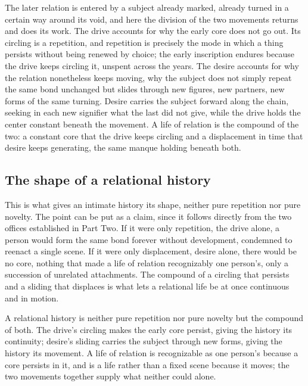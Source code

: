 The later relation is entered by a subject already marked, already turned in a certain way around its void, and here the division of the two movements returns and does its work. The drive accounts for why the early core does not go out. Its circling is a repetition, and repetition is precisely the mode in which a thing persists without being renewed by choice; the early inscription endures because the drive keeps circling it, unspent across the years. The desire accounts for why the relation nonetheless keeps moving, why the subject does not simply repeat the same bond unchanged but slides through new figures, new partners, new forms of the same turning. Desire carries the subject forward along the chain, seeking in each new signifier what the last did not give, while the drive holds the center constant beneath the movement. A life of relation is the compound of the two: a constant core that the drive keeps circling and a displacement in time that desire keeps generating, the same manque holding beneath both.

\subsection*{The shape of a relational history}

This is what gives an intimate history its shape, neither pure repetition nor pure novelty. The point can be put as a claim, since it follows directly from the two offices established in Part Two. If it were only repetition, the drive alone, a person would form the same bond forever without development, condemned to reenact a single scene. If it were only displacement, desire alone, there would be no core, nothing that made a life of relation recognizably one person's, only a succession of unrelated attachments. The compound of a circling that persists and a sliding that displaces is what lets a relational life be at once continuous and in motion.

\begin{claim}
A relational history is neither pure repetition nor pure novelty but the compound of both. The drive's circling makes the early core persist, giving the history its continuity; desire's sliding carries the subject through new forms, giving the history its movement. A life of relation is recognizable as one person's because a core persists in it, and is a life rather than a fixed scene because it moves; the two movements together supply what neither could alone.
\end{claim}

